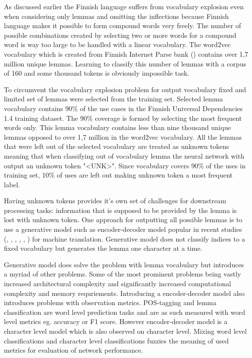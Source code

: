 \documentclass[12pt,a4paper,english
]{tutthesis}
\begin{document}
As discussed earlier the Finnish language suffers from vocabulary explosion even when considering only lemmas and omitting the inflections because Finnish language makes it possible to form compound words very freely. The number of possible combinations created by selecting two or more words for a compound word is way too large to be handled with a linear vocabulary. The word2vec vocabulary which is created from Finnish Internet Parse bank (\cite{Kanerva2014}) contains over 1,7 million unique lemmas. Learning to classify this number of lemmas with a corpus of 160 and some thousand tokens is obviously impossible task.

To circumvent the vocabulary explosion problem for output vocabulary fixed and limited set of lemmas were selected from the training set. Selected lemma vocabulary contains 90\% of the use cases in the Finnish Universal Dependencies 1.4 training dataset. The 90\% coverage is formed by selecting the most frequent words only. This lemma vocabulary contains less than nine thousand unique lemmas opposed to over 1,7 million in the word2vec vocabulary. All the lemmas that were left out of the selected vocabulary are treated as unknown tokens meaning that when classifying out of vocabulary lemma the neural network with output an unknown token "<UNK>". Since vocabulary covers 90\% of the uses in training set, 10\% of uses are left out making unknown token a most frequent label.

Having unknown tokens provides it's own set of challenges for downstream processing tasks: information that is supposed to be provided by the lemma is lost with unknown token. One approach for outputting all possible lemmas is to use a generative model such as encoder-decoder model popular in recent studies (\cite{Sutskever2014}, \cite{Cho2014}, \cite{Chung2016}, \cite{Bahdanau2014}, \cite{Liu2016a}, \cite{Chung2016}) for machine translation. Generative model does not classify indices to a fixed vocabulary but generates the lemma one character at a time.

Generative model does solve the problem with lemma vocabulary but introduces a myriad of other problems. Some of the most prominent problems being vastly increased architectural complexity and significantly increased computational complexity and memory requriements. Introducing a encoder-decoder model also introduces problems with observation metrics. POS-tagging and lemma classification are word level prediction tasks and are as such measured with word level metrics eg. accuracy or F1 score. However encoder-decoder model is a character level model which is also observed on character level. Mixing word level classifications and character level classifications fuzzies the meaning of used metrics for evaluation of network performance.
\end{document}
